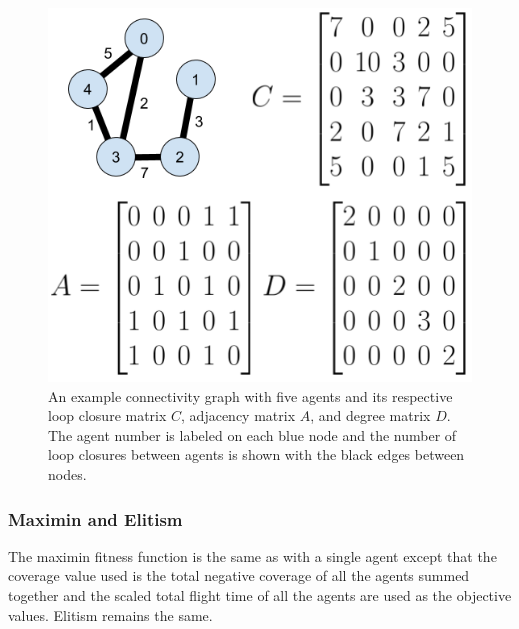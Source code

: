 \documentclass[letterpaper, 10 pt, conference]{ieeeconf}  %
\begin{document}
\begin{figure}
\centering
\includegraphics[width=0.8\linewidth]{figures/connectivity.png}
\caption{An example connectivity graph with five agents and its respective loop closure matrix $C$, adjacency matrix $A$, and degree matrix $D$. The agent number is labeled on each blue node and the number of loop closures between agents is shown with the black edges between nodes.
}
\label{fig:connectivity}
\end{figure}


\subsubsection{Maximin and Elitism}
The maximin fitness function is the same as with a single agent except that the coverage value used is the total negative coverage of all the agents summed together and the scaled total flight time of all the agents are used as the objective values. Elitism remains the same.
\end{document}
